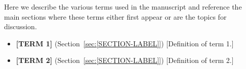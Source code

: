 
Here we describe the various terms used in the manuscript and reference the main sections
where these terms either first appear or are the topics for discussion.

\begin{itemize}

  \item \textbf{[TERM 1]}
    (Section~\ref{sec:[SECTION-LABEL]})
    [Definition of term 1.]

  \item \textbf{[TERM 2]}
    (Section~\ref{sec:[SECTION-LABEL]})
    [Definition of term 2.]

\end{itemize}
